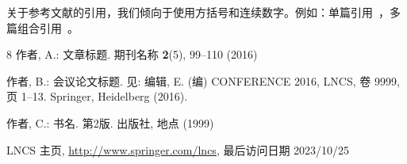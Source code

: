 \documentclass[runningheads]{ctexart}
\begin{document}
关于参考文献的引用，我们倾向于使用方括号和连续数字。例如：单篇引用~\cite{ref_article1}，多篇组合引用~\cite{ref_article1,ref_lncs1,ref_book1}。

\begin{thebibliography}{8}
作者, A.: 文章标题. 期刊名称 \textbf{2}(5), 99--110 (2016)

作者, B.: 会议论文标题. 见: 编辑, E. (编) CONFERENCE 2016, LNCS, 卷 9999, 页 1--13. Springer, Heidelberg (2016).

作者, C.: 书名. 第2版. 出版社, 地点 (1999)

LNCS 主页, \url{http://www.springer.com/lncs}, 最后访问日期 2023/10/25
\end{thebibliography}
\end{document}

